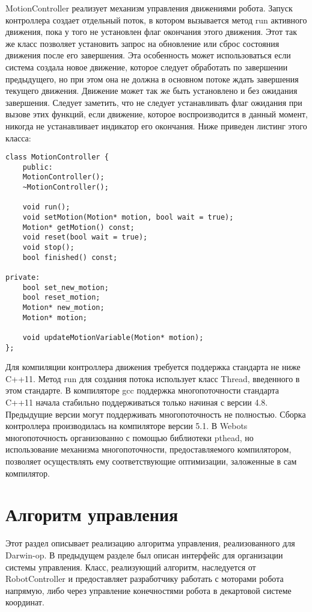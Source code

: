 MotionController реализует механизм управления движениями робота. Запуск контроллера создает отдельный поток, в котором вызывается метод run активного движения, пока у того не установлен флаг окончания этого движения. Этот  так же класс позволяет установить запрос на обновление или сброс состояния движения после его завершения. Эта особенность может использоваться если система создала новое движение, которое следует обработать по завершении предыдущего, но при этом она не должна в основном потоке ждать завершения текущего движения. Движение может так же быть установлено и без ожидания завершения. Следует заметить, что не следует устанавливать флаг ожидания при вызове этих функций, если движение, которое воспроизводится в данный момент, никогда не устанавливает индикатор его окончания. Ниже приведен листинг этого класса:

\lstset{language=C++}
\begin{lstlisting}
class MotionController {
    public:
    MotionController();
    ~MotionController();
        
    void run();
    void setMotion(Motion* motion, bool wait = true);
    Motion* getMotion() const;    
    void reset(bool wait = true);
    void stop();
    bool finished() const;
        
private:
    bool set_new_motion;
    bool reset_motion;
    Motion* new_motion;
    Motion* motion;

    void updateMotionVariable(Motion* motion);
};
\end{lstlisting}

Для компиляции контроллера движения требуется поддержка стандарта не ниже C++11. Метод run для создания потока использует класс Thread, введенного в этом стандарте. В компиляторе gcc поддержка многопоточности стандарта C++11 начала стабильно поддерживаться только начиная с версии 4.8. Предыдущие версии могут поддерживать многопоточность не полностью. Сборка контроллера производилась на компиляторе версии 5.1. В Webots многопоточность организованно с помощью библиотеки pthead, но использование механизма многопоточности, предоставляемого компилятором, позволяет осуществлять ему соответствующие оптимизации, заложенные в сам компилятор.

\section{Алгоритм управления}

Этот раздел описывает реализацию алгоритма управления, реализованного для Darwin-op. В предыдущем разделе был описан интерфейс для организации системы управления. Класс, реализующий алгоритм, наследуется от RobotController и предоставляет разработчику работать с моторами робота напрямую, либо через управление конечностями робота в декартовой системе координат.

